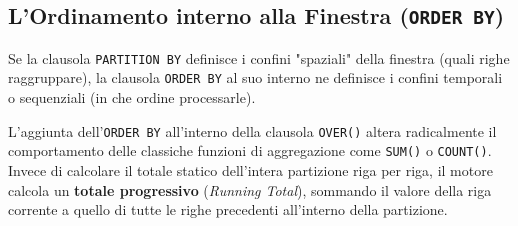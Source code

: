 \subsection{L'Ordinamento interno alla Finestra (\texttt{ORDER BY})}

Se la clausola \texttt{PARTITION BY} definisce i confini "spaziali" della finestra (quali righe raggruppare), la clausola \texttt{ORDER BY} al suo interno ne definisce i confini temporali o sequenziali (in che ordine processarle).

L'aggiunta dell'\texttt{ORDER BY} all'interno della clausola \texttt{OVER()} altera radicalmente il comportamento delle classiche funzioni di aggregazione come \texttt{SUM()} o \texttt{COUNT()}. Invece di calcolare il totale statico dell'intera partizione riga per riga, il motore calcola un \textbf{totale progressivo} (\textit{Running Total}), sommando il valore della riga corrente a quello di tutte le righe precedenti all'interno della partizione.

